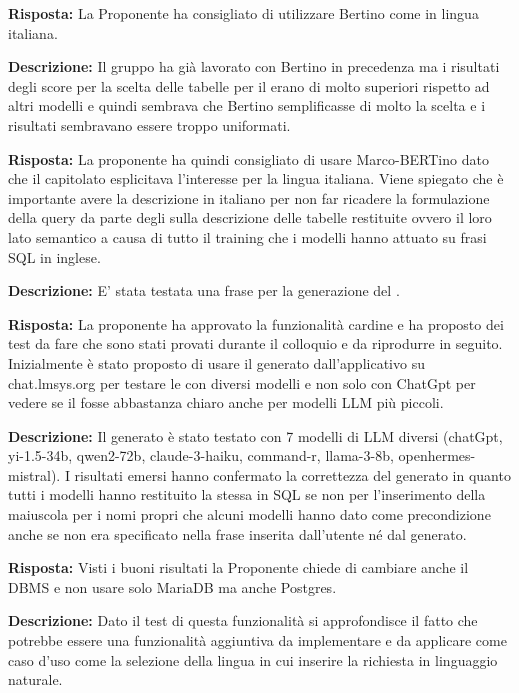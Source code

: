 \par \textbf{Risposta:} La Proponente ha consigliato di utilizzare Bertino come  in lingua italiana.

\par \textbf{Descrizione:} Il gruppo ha già lavorato con Bertino in precedenza ma i risultati degli score per la scelta delle tabelle per il  erano di molto superiori rispetto ad altri modelli e quindi sembrava che Bertino semplificasse di molto la scelta e i risultati sembravano essere troppo uniformati.
\par \textbf{Risposta:} La proponente ha quindi consigliato di usare Marco-BERTino dato che il capitolato esplicitava l’interesse per la lingua italiana. Viene spiegato che è importante avere la descrizione in italiano per non far ricadere la formulazione della query da parte degli  sulla descrizione delle tabelle restituite ovvero il loro lato semantico a causa di tutto il training che i modelli hanno attuato su frasi SQL in inglese.

\par \textbf{Descrizione:} E’ stata testata una frase per la generazione del .
\par \textbf{Risposta:} La proponente ha approvato la funzionalità cardine e ha proposto dei test da fare che sono stati provati durante il colloquio e da riprodurre in seguito. Inizialmente è stato proposto di usare il  generato dall’applicativo su chat.lmsys.org per testare le  con diversi modelli e non solo con ChatGpt per vedere se il  fosse abbastanza chiaro anche per modelli LLM più piccoli.
\par \textbf{Descrizione:} Il  generato è stato testato con 7 modelli di LLM diversi (chatGpt, yi-1.5-34b, qwen2-72b, claude-3-haiku, command-r, llama-3-8b, openhermes-mistral). I risultati emersi hanno confermato la correttezza del  generato in quanto tutti i modelli hanno restituito la stessa  in SQL se non per l'inserimento della maiuscola per i nomi propri che alcuni modelli hanno dato come precondizione anche se non era specificato nella frase inserita dall’utente né dal  generato.

\par \textbf{Risposta:} Visti i buoni risultati la Proponente chiede di cambiare anche il DBMS e non usare solo MariaDB ma anche Postgres.

\par \textbf{Descrizione:} Dato il test di questa funzionalità si approfondisce il fatto che potrebbe essere una funzionalità aggiuntiva da implementare e da applicare come caso d’uso come la selezione della lingua in cui inserire la richiesta in linguaggio naturale.

